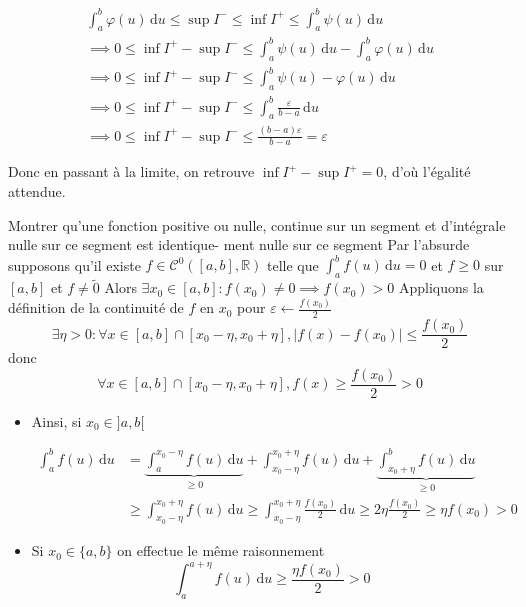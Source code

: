 \documentclass{article}
\begin{document}
\begin{question_kholle}
\begin{itemize}[label=$\lozenge$]
		\begin{align*}
			\int_{a}^{b} \varphi(u) \, \mathrm du  \leqslant \sup I^{-} \leqslant \inf I^{+} \leqslant \int_{a}^{b} \psi(u) \, \mathrm du \\
			\implies 0 \leqslant \inf I^{+} - \sup I^{-} \leqslant \int_{a}^{b} \psi(u) \, \mathrm du - \int_{a}^{b} \varphi(u) \, \mathrm du \\
			\implies 0 \leqslant \inf I^{+} - \sup I^{-} \leqslant \int_{a}^{b} \psi(u) - \varphi(u) \, \mathrm du   \\
			\implies 0 \leqslant \inf I^{+} - \sup I^{-} \leqslant \int_{a}^{b} \frac{\varepsilon}{b-a} \, \mathrm du  \\
			\implies 0 \leqslant \inf I^{+} - \sup I^{-} \leqslant \frac{(b-a)\varepsilon}{b-a} = \varepsilon
		\end{align*}
		
		
		Donc en passant à la limite, on retrouve $\inf I^{+} - \sup I^{+} = 0$, d'où l'égalité attendue.
	\end{itemize}
\end{question_kholle}
\begin{question_kholle}{Montrer qu'une fonction positive ou nulle, continue sur un segment et d'intégrale nulle sur ce segment est identique- ment nulle sur ce segment}
	Par l'absurde supposons qu'il existe $f \in \mathcal{C}^{0}([a, b], \mathbb{R})$ telle que $\int_{a}^{b} f(u) \, \mathrm du = 0$ et $f \geqslant 0$ sur $[a, b]$ et $f \neq \tilde{0}$
	Alors $\exists x_{0} \in [a, b]: f(x_{0}) \neq 0 \implies f(x_{0})>0$
	Appliquons la définition de la continuité de $f$ en $x_{0}$ pour $\varepsilon \leftarrow \frac{f(x_{0})}{2}$
$$
	\exists \eta >0 : \forall x \in [a, b] \cap [x_{0}-\eta, x_{0}+\eta], \lvert f(x)-f(x_{0}) \rvert \leqslant \frac{f(x_{0})}{2}
$$
	donc
$$
	\forall x \in [a, b] \cap [x_{0}-\eta, x_{0}+\eta], f(x) \geqslant \frac{f(x_{0})}{2}>0
$$
	
	\begin{itemize}
		\item Ainsi, si $x_{0} \in ]a, b[$
		
		\begin{align*}
			\int_{a}^{b} f(u) \, \mathrm du &=  \underbrace{ \int_{a}^{x_{0}-\eta} f(u) \, \mathrm du }_{ \geqslant 0 } + \int_{x_{0}-\eta}^{x_{0}+\eta} f(u) \, \mathrm du + \underbrace{ \int_{x_{0}+\eta}^{b} f(u) \, \mathrm du }_{ \geqslant 0 } \\
			&\geqslant \int_{x_{0}-\eta}^{x_{0}+\eta}f(u)  \, \mathrm du \geqslant \int_{x_{0}-\eta}^{x_{0}+\eta} \frac{f(x_{0})}{2}  \, \mathrm du \geqslant 2 \eta \frac{f(x_{0})}{2} \geqslant \eta f(x_{0}) > 0
		\end{align*}
		
		
		\item Si $x_{0} \in \{ a, b \}$ on effectue le même raisonnement
$$
		\int_{a}^{a+\eta} f(u) \, \mathrm du \geqslant \frac{\eta f(x_{0})}{2} > 0
$$
	\end{itemize}
\end{question_kholle}
\end{document}
